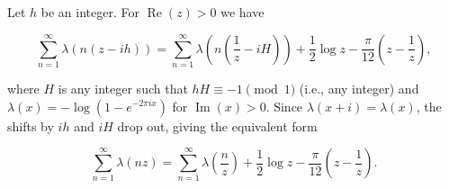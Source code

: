 Let $h$ be an integer. For $\operatorname{Re}(z) > 0$ we have

$$\sum_{n=1}^{\infty} \lambda\!\left(n(z - ih)\right) = \sum_{n=1}^{\infty} \lambda\!\left(n\!\left(\frac{1}{z} - iH\right)\right) + \frac{1}{2}\log z - \frac{\pi}{12}\!\left(z - \frac{1}{z}\right),$$

where $H$ is any integer such that $hH \equiv -1 \pmod{1}$ (i.e., any integer) and $\lambda(x) = -\log(1 - e^{-2\pi i x})$ for $\operatorname{Im}(x) > 0$. Since $\lambda(x + i) = \lambda(x)$, the shifts by $ih$ and $iH$ drop out, giving the equivalent form

$$\sum_{n=1}^{\infty} \lambda(nz) = \sum_{n=1}^{\infty} \lambda\!\left(\frac{n}{z}\right) + \frac{1}{2}\log z - \frac{\pi}{12}\!\left(z - \frac{1}{z}\right).$$
